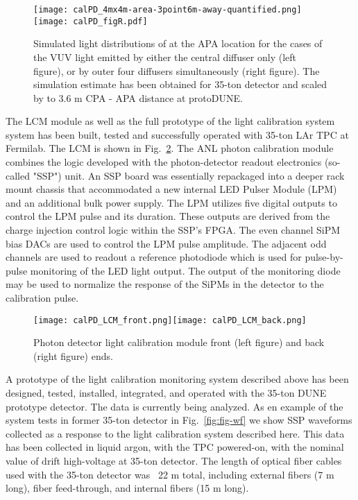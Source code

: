 %
 \begin{figure}[h]
  \centering
\texttt{[image: calPD\_4mx4m-area-3point6m-away-quantified.png]}\texttt{[image: calPD\_figR.pdf]}
\caption{Simulated light distributions of at the APA location for the cases of the VUV light emitted by either the central diffuser only (left figure), or by outer four diffusers simultaneously (right figure).
The simulation estimate has been obtained for 35-ton detector and scaled by to 3.6 m CPA - APA distance at protoDUNE.}
\label{fig:fig-c-4}
\end{figure}
%

The LCM module as well as the full prototype of the light calibration system system has been built, tested and successfully operated with 35-ton LAr TPC at Fermilab. The LCM is shown in Fig.~\ref{fig:fig-c-3}. 
The ANL photon calibration module combines the logic developed with the photon-detector readout electronics (so-called "SSP") unit.  An SSP board was essentially repackaged into a deeper rack mount 
chassis that accommodated a new internal LED Pulser Module (LPM) and an additional bulk power supply. The LPM utilizes five digital outputs to control the LPM pulse and its duration.  
These outputs are derived from the charge injection control logic within the SSP's FPGA.  The even channel SiPM bias DACs are used to control the LPM pulse amplitude.  
The adjacent odd channels are used to readout a reference photodiode which is used for pulse-by-pulse monitoring of the LED light output.  The output of the monitoring diode may be used to normalize 
the response of the SiPMs in the detector to the calibration pulse.

%
 \begin{figure}[h]
  \centering
\texttt{[image: calPD\_LCM\_front.png]}\texttt{[image: calPD\_LCM\_back.png]}
\caption{Photon detector light calibration module front (left figure) and back (right figure) ends.}
\label{fig:fig-c-3}
\end{figure}

A prototype of the light calibration monitoring system described above has been designed, tested, installed, integrated, and operated with the 35-ton DUNE prototype detector.
The data is currently being analyzed. As en example of the system tests in former 35-ton detector in Fig.~\ref{fig:fig-wf} we show SSP waveforms collected as a response to the light calibration system described here.
This data has been collected in liquid argon, with the TPC powered-on, with the nominal value of drift high-voltage at 35-ton detector. The length of optical fiber cables used with the 35-ton detector 
was ~22 m total, including external fibers (7 m long), fiber feed-through, and internal fibers (15 m long).


